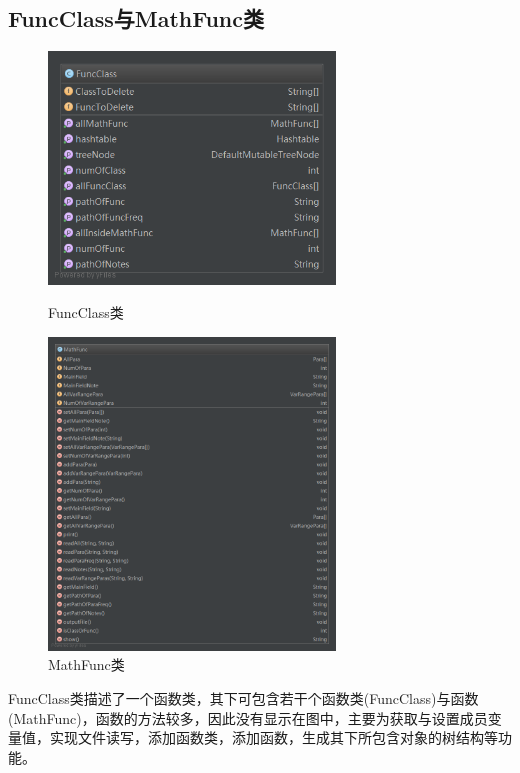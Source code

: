 \documentclass[hyperref, UTF8
,bookmarksnumbered=true, oneside]{ctexbook}
\begin{document}
		\subsection{FuncClass与MathFunc类} %
		\label{sub:funcclass}
			\begin{figure}[!h]
				\begin{minipage}[b]{0.45\textwidth}
				\centering
				\includegraphics[width=3in]{FuncClass.png}
				\caption{FuncClass类}
				\label{pic:MathPack}
				\end{minipage}%
				\hspace{0.1\textwidth}%
				\begin{minipage}[b]{0.45\textwidth}
				\centering
				\includegraphics[width=3in]{MathFunc.png}
				\caption{MathFunc类}
				\label{pic:GUIPack}
				\end{minipage}
			\end{figure}

			FuncClass类描述了一个函数类，其下可包含若干个函数类(FuncClass)与函数(MathFunc)，函数的方法较多，因此没有显示在图中，主要为获取与设置成员变量值，实现文件读写，添加函数类，添加函数，生成其下所包含对象的树结构等功能。
\end{document}
